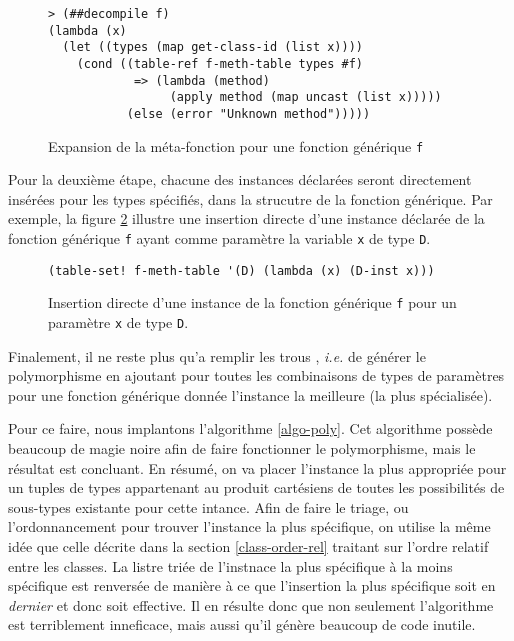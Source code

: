 \documentclass[letterpaper,12pt]{book}
\begin{document}
      \begin{figure}[h!]
        \begin{lstlisting}
> (##decompile f)
(lambda (x)
  (let ((types (map get-class-id (list x))))
    (cond ((table-ref f-meth-table types #f)
            => (lambda (method) 
                 (apply method (map uncast (list x)))))
           (else (error "Unknown method")))))
        \end{lstlisting}
        \caption{Expansion de la méta-fonction pour une fonction
          générique \texttt{f}}
        \label{meta-genfun}
      \end{figure}
      
      Pour la deuxième étape, chacune des instances déclarées seront
      directement insérées pour les types spécifiés, dans la strucutre
      de la fonction générique. Par exemple, la figure
      \ref{ex-insertion-directe-meth} illustre une insertion directe
      d'une instance déclarée de la fonction générique \texttt{f}
      ayant comme paramètre la variable \texttt{x} de type \texttt{D}.

      \begin{figure}[h!]
        \begin{lstlisting}
(table-set! f-meth-table '(D) (lambda (x) (D-inst x)))
        \end{lstlisting}
        \caption{Insertion directe d'une instance de la fonction
          générique \texttt{f} pour un paramètre \texttt{x} de type
          \texttt{D}.}
        \label{ex-insertion-directe-meth}
      \end{figure}

      Finalement, il ne reste plus qu'a \og remplir les trous \fg,
      \textit{i.e.} de générer le polymorphisme en ajoutant pour
      toutes les combinaisons de types de paramètres pour une fonction
      générique donnée l'instance la meilleure (la plus spécialisée).

      Pour ce faire, nous implantons l'algorithme \ref{algo-poly}. Cet
      algorithme possède beaucoup de \og magie noire \fg afin de faire
      fonctionner le polymorphisme, mais le résultat est concluant. En
      résumé, on va placer l'instance la plus appropriée pour un
      tuples de types appartenant au produit cartésiens de toutes les
      possibilités de sous-types existante pour cette intance. Afin de
      faire le triage, ou l'ordonnancement pour trouver l'instance la
      plus spécifique, on utilise la même idée que celle décrite dans
      la section \ref{class-order-rel} traitant sur l'ordre relatif
      entre les classes. La listre triée de l'instnace la plus
      spécifique à la moins spécifique est renversée de manière à ce
      que l'insertion la plus spécifique soit en \emph{dernier} et
      donc soit effective. Il en résulte donc que non seulement
      l'algorithme est terriblement inneficace, mais aussi qu'il
      génère beaucoup de code inutile.
\end{document}

